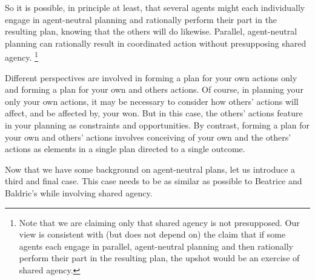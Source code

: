 \documentclass[12pt,\papersize]{extarticle}
\begin{document}
	So it is possible, in principle at least, 
	that several agents might each individually engage in agent-neutral planning and rationally perform their part in the resulting plan, knowing that the others will do likewise.
	Parallel, agent-neutral planning can rationally result in coordinated action without presupposing shared agency.%
\footnote{
Note that we are claiming only that shared agency is not presupposed.
Our view is consistent with (but does not depend on) the claim
that
	if some agents each engage in parallel, agent-neutral planning and then rationally perform their part in the resulting plan,
	the upshot would be an exercise of shared agency.
}


Different perspectives are involved in
	forming a plan for  your own actions  only
and 
	forming a plan for  your own and others actions.
  Of course, in planning your only your own actions, it may be necessary to consider how others' actions will affect, and be affected by, your won.
But in this case, the others' actions feature in your planning as constraints and opportunities.
By contrast, forming a plan for your own and others' actions 
	involves conceiving of your own and the others' actions as elements in a single plan directed to a single outcome.


Now that we have some background on agent-neutral plans,
let us introduce a third and final case.
This case needs to be as similar as possible to Beatrice and Baldric's while involving shared agency.
\end{document}
